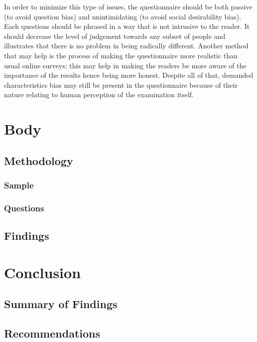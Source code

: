 \documentclass[12pt]{report}
\begin{document}
In order to minimize this type of issues, the questionnaire should be both
passive (to avoid question bias) and unintimidating (to avoid social
desirability bias). Each questions should be phrased in a way that is not
intrusive to the reader. It should decrease the level of judgement towards any
subset of people and illustrates that there is no problem in being radically
different. Another method that may help is the process of making the
questionnaire more realistic than usual online surveys; this may help in making
the readers be more aware of the importance of the results hence being more
honest. Despite all of that, demanded characteristics bias may still be present
in the questionnaire because of their nature relating to human perception of the
examination itself.

\chapter{Body}
\section{Methodology}

\subsection{Sample}

\subsection{Questions}

\section{Findings}

\lipsum

\chapter{Conclusion}
\section{Summary of Findings}
\section{Recommendations}

\lipsum

\printbibliography[heading=bibnumbered]
\end{document}
